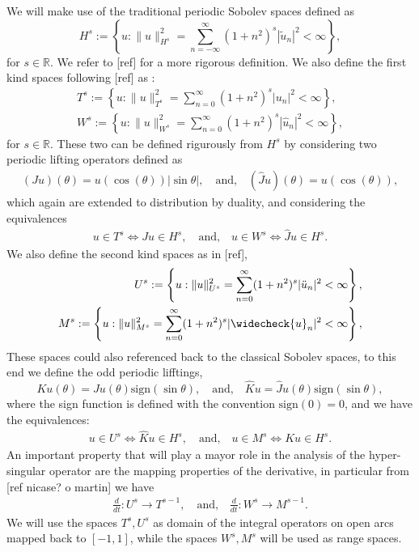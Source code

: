 \documentclass{article}
\newcommand{\todo}[1]{{\color{red}[#1]}}
\newcommand{\IR}{{\mathbb R}}
\begin{document}
We will make use of the traditional periodic Sobolev spaces defined as 
$$
H^s := \left\lbrace u : \| u\|_{H^s}^2 = \sum_{n=-\infty}^\infty (1+n^2)^s |\widetilde{u}_n|^2 < \infty \right\rbrace,
$$
for $s\in \IR$. We refer to \todo{ref} for a more rigorous definition. We also define the first kind spaces following \todo{ref} as : 
\begin{align*}
T^s := \left\lbrace u : \| u\|_{T^s}^2 = \sum_{n=0}^\infty (1+n^2)^s |{u}_n|^2 < \infty \right\rbrace, \\
W^s := \left\lbrace u : \| u\|_{W^s}^2 = \sum_{n=0}^\infty (1+n^2)^s |\widehat{u}_n|^2 < \infty \right\rbrace,
\end{align*} 
for $s \in \IR$. These two can be defined rigurously from $H^s$ by considering two periodic lifting operators defined as 
\begin{align}
\label{eq:liffings}
(Ju) (\theta) = u(\cos(\theta)) | \sin \theta|, \quad \text{and,} \quad
(\widehat{J}u)(\theta) = u (\cos(\theta)),
\end{align}
which again are extended to distribution by duality, and considering the equivalences 
\begin{align*}
u \in T^s \Leftrightarrow Ju \in H^s, \quad \text{and,} \quad u \in W^s \Leftrightarrow \widehat{J}u \in H^s.
\end{align*}
We also define the second kind spaces as in \todo{ref}, 
\begin{align*}
U^s := \left\lbrace u : \| u\|_{U^s}^2 = \sum_{n=0}^\infty (1+n^2)^s |\ddot{u}_n|^2 < \infty \right\rbrace, \\
M^s := \left\lbrace u : \| {u}\|_{M^s}^2 = \sum_{n=0}^\infty (1+n^2)^s |\widecheck{u}_n|^2 < \infty \right\rbrace,
\end{align*} 
These spaces could also referenced back to the classical Sobolev spaces, to this end we define the odd periodic lifftings, 
$$
Ku(\theta) = Ju(\theta) \text{sign}(\sin\theta), \quad \text{and,}\quad \widehat{K}u = \widehat{J}u(\theta) \text{sign}(\sin\theta),
$$
where the sign function is defined with the convention $\text{sign}(0)=0$, and we have the equivalences: 
\begin{align*}
u \in U^s \Leftrightarrow \widehat{K}u \in H^s, \quad \text{and,} \quad u \in M^s \Leftrightarrow Ku \in H^s.
\end{align*}
An important property that will play a mayor role in the analysis of the hyper-singular operator are the mapping properties of the derivative, in particular from \todo{ref nicase? o martin} we have 
\begin{align*}
\frac{d}{dt} : U^s \rightarrow T^{s-1}, \quad \text{and,} \quad 
\frac{d}{dt} : W^s \rightarrow M^{s-1}.
\end{align*}
We will use the spaces $T^s,U^s$ as domain of the integral operators on open arcs mapped back to $[-1,1]$, while the spaces $W^s, M^s$ will be used as range spaces.
\end{document}
